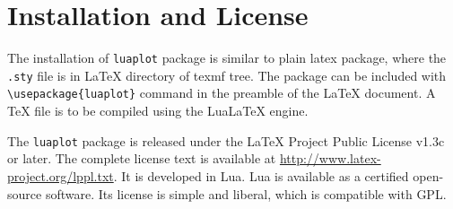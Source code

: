 \documentclass{article}
\begin{document}
\section{Installation and License}

The installation of \verb|luaplot| package is similar to plain latex package, where the \texttt{.sty} file is in LaTeX directory of texmf tree. The package can be included with \verb|\usepackage{luaplot}| command in the preamble of the LaTeX document. A TeX file is to be compiled using the LuaLaTeX engine.

The \verb|luaplot| package is released under the LaTeX Project Public License v1.3c or later. The complete license text is available at \url{http://www.latex-project.org/lppl.txt}. It is developed in Lua.  Lua is available as a certified open-source software. Its license is simple and liberal, which is compatible with GPL.
\end{document}
